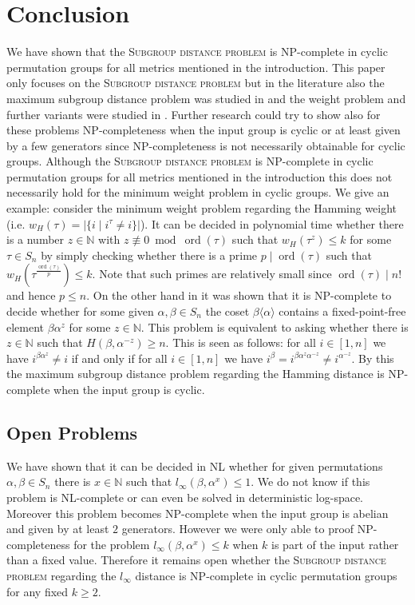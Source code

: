 \documentclass{article}
\DeclareMathOperator{\ord}{ord}
\begin{document}
\section{Conclusion}
We have shown that the \textsc{Subgroup distance problem} is {\sf NP}-complete in cyclic permutation groups for all metrics mentioned in the introduction. This paper only focuses on the \textsc{Subgroup distance problem} but in the literature also the maximum subgroup distance problem was studied in \cite{buchheim} and the weight problem and further variants were studied in \cite{cameron}. Further research could try to show also for these problems {\sf NP}-completeness when the input group is cyclic or at least given by a few generators since {\sf NP}-completeness is not necessarily obtainable for cyclic groups. Although the \textsc{Subgroup distance problem} is {\sf NP}-complete in cyclic permutation groups for all metrics mentioned in the introduction this does not necessarily hold for the minimum weight problem in cyclic groups. We give an example: consider the minimum weight problem regarding the Hamming weight (i.e. $w_H(\tau) = |\{i \mid i^\tau \neq i\}|$). It can be decided in polynomial time whether there is a number $z \in \mathbb{N}$ with $z \not \equiv 0 \bmod \ord(\tau)$ such that $w_H(\tau^z) \leq k$ for some $\tau \in S_n$ by simply checking whether there is a prime $p \mid \ord(\tau)$ such that $w_H\left(\tau^{\frac{\ord(\tau)}{p}}\right) \leq k$. Note that such primes are relatively small since $\ord(\tau) \mid n!$ and hence $p \leq n$. On the other hand in \cite{lohrey} it was shown that it is {\sf NP}-complete to decide whether for some given $\alpha,\beta \in S_n$ the coset $\beta \langle \alpha \rangle$ contains a fixed-point-free element $\beta\alpha^z$ for some $z \in \mathbb{N}$. This problem is equivalent to asking whether there is $z \in \mathbb{N}$ such that $H(\beta,\alpha^{-z}) \geq n$. This is seen as follows: for all $i \in [1,n]$ we have $i^{\beta\alpha^z} \neq i$ if and only if for all $i \in [1,n]$ we have $i^{\beta} = i^{\beta\alpha^z\alpha^{-z}} \neq i^{\alpha^{-z}}$. By this the maximum subgroup distance problem regarding the Hamming distance is {\sf NP}-complete when the input group is cyclic.

\subsection{Open Problems}
We have shown that it can be decided in {\sf NL} whether for given permutations $\alpha,\beta \in S_n$ there is $x \in \mathbb{N}$ such that $l_\infty(\beta,\alpha^x) \leq 1$. We do not know if this problem is {\sf NL}-complete or can even be solved in deterministic log-space. Moreover this problem becomes {\sf NP}-complete when the input group is abelian and given by at least $2$ generators. However we were only able to proof {\sf NP}-completeness for the problem $l_\infty(\beta,\alpha^x) \leq k$ when $k$ is part of the input rather than a fixed value. Therefore it remains open whether the \textsc{Subgroup distance problem} regarding the $l_\infty$ distance is {\sf NP}-complete in cyclic permutation groups for any fixed $k \geq 2$.
\end{document}
